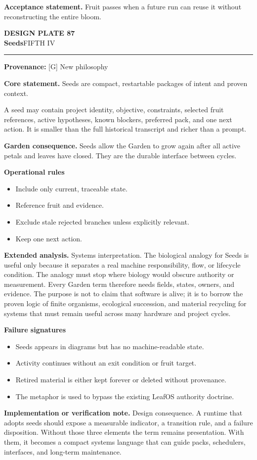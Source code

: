 \documentclass[10pt,letterpaper,oneside]{article}
\newcommand{\prov}[1]{\textcolor{gardenBlue}{\sffamily\footnotesize\textbf{Provenance:} #1}}
\newcommand{\platetitle}[3]{%
  \begin{minipage}[t][0.54in][t]{\textwidth}
  {\sffamily\bfseries\color{gardenDeep}\fontsize{9}{10}\selectfont DESIGN PLATE #1}\\[-1pt]
  {\sffamily\bfseries\color{gardenInk}\fontsize{16.5}{18}\selectfont #2}\hfill{\sffamily\color{gardenGreen}\large #3}
  \end{minipage}\vspace{-2pt}\hrule\vspace{5pt}}
\begin{document}
\begin{acceptbox}
\textbf{Acceptance statement.} Fruit passes when a future run can reuse it without reconstructing the entire bloom.
\end{acceptbox}
\newpage
\platetitle{87}{Seeds}{FIFTH IV}
\prov{[G] New philosophy}
\fontsize{8.85}{10.45}\selectfont
\begin{corebox}
\textbf{Core statement.} Seeds are compact, restartable packages of intent and proven context.
\end{corebox}
A seed may contain project identity, objective, constraints, selected fruit references, active hypotheses, known blockers, preferred pack, and one next action. It is smaller than the full historical transcript and richer than a prompt.

\textbf{Garden consequence.} Seeds allow the Garden to grow again after all active petals and leaves have closed. They are the durable interface between cycles.

\textbf{Operational rules}
\begin{itemize}
\item Include only current, traceable state.
\item Reference fruit and evidence.
\item Exclude stale rejected branches unless explicitly relevant.
\item Keep one next action.
\end{itemize}
\textbf{Extended analysis.} Systems interpretation. The biological analogy for Seeds is useful only because it separates a real machine responsibility, flow, or lifecycle condition. The analogy must stop where biology would obscure authority or measurement. Every Garden term therefore needs fields, states, owners, and evidence. The purpose is not to claim that software is alive; it is to borrow the proven logic of finite organisms, ecological succession, and material recycling for systems that must remain useful across many hardware and project cycles.

\textbf{Failure signatures}
\begin{itemize}
\item Seeds appears in diagrams but has no machine-readable state.
\item Activity continues without an exit condition or fruit target.
\item Retired material is either kept forever or deleted without provenance.
\item The metaphor is used to bypass the existing LeafOS authority doctrine.
\end{itemize}
\textbf{Implementation or verification note.} Design consequence. A runtime that adopts seeds should expose a measurable indicator, a transition rule, and a failure disposition. Without those three elements the term remains presentation. With them, it becomes a compact systems language that can guide packs, schedulers, interfaces, and long-term maintenance.
\end{document}
